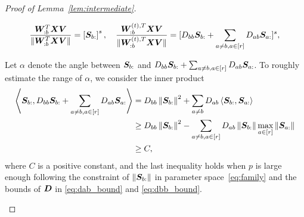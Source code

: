 \documentclass[lettersize,onecolumn,journal]{IEEEtran}
\theoremstyle{definition}
\theoremstyle{definition}
\newcommand{\off}[1]{\left[#1\right]}
\newcommand{\offf}[1]{\left\{#1\right\}}
\newcommand{\ang}[1]{\left\langle#1\right\rangle}
\begin{document}
\begin{proof}[Proof of Lemma~\ref{lem:intermediate}]
\begin{enumerate}
    \begin{equation}
        \frac{ \mW_{:b}^T \mX \mV  }{\onormSize{}{  \mW_{:b}^T \mX \mV }} = \off{\mS_{b:}}^s, \quad \frac{ \mW_{:b}^{(t), T} \mX \mV  }{ \onormSize{}{\mW_{:b}^{(t), T} \mX \mV }} = [D_{bb} \mS_{b:} + \sum_{a \neq b, a \in [r]} D_{ab} \mS_{a:}]^s, 
    \end{equation}
    
    Let $\alpha$ denote the angle between $\bm S_{b:}$ and $D_{bb} \bm S_{b:} + \sum_{a \neq b, a \in [r]} D_{ab} \bm S_{a:}$. To roughly estimate the range of $\alpha$, we consider the inner product 
    \begin{align}
        \ang{\mS_{b:},  D_{bb} \mS_{b:} + \sum_{a \neq b, a \in [r]} D_{ab} \mS_{a:}}  &= D_{bb} \onorm{\mS_{b:}}^2 + \sum_{a \neq b} D_{ab}\ang{\mS_{b:}, \mS_{a:}}\\
        &\geq D_{bb} \onorm{\mS_{b:}}^2 -  \sum_{a \neq b, a \in [r]} D_{ab}   \onorm{\mS_{b:}} \max_{a \in [r]}  \onorm{\mS_{a:}} \\
        & \geq C,
    \end{align}
    where $C$ is a positive constant, and the last inequality holds when $p$ is large enough following the constraint of $\left\lVert\bm S_{b:}\right\rVert$ in parameter space~\eqref{eq:family} and the bounds of $\bm{D}$ in \eqref{eq:dab_bound} and \eqref{eq:dbb_bound}.
    

\end{enumerate}
\end{proof}
\end{document}
